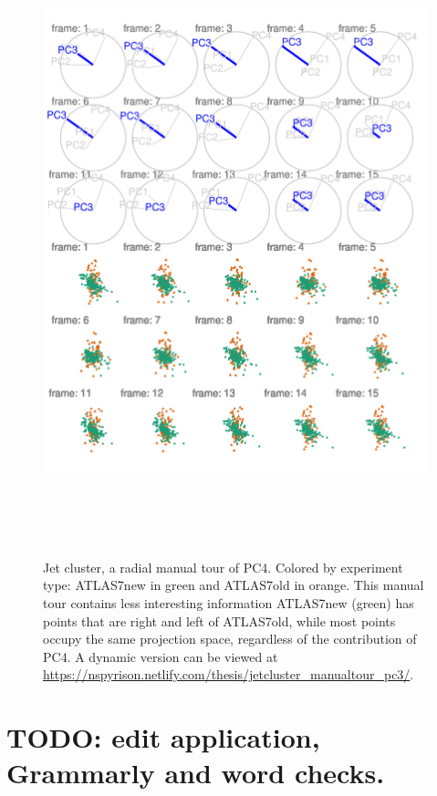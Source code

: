\documentclass{monashthesis}
\begin{document}
\begin{figure}

{\centering \includegraphics[width=6in,height=7.2in]{./figures/JetClusterBad} 

}

\caption{Jet cluster, a radial manual tour of PC4. Colored by experiment type: ATLAS7new in green and ATLAS7old in orange. This manual tour contains less interesting information ATLAS7new (green) has points that are right and left of ATLAS7old, while most points occupy the same projection space, regardless of the contribution of PC4. A dynamic version can be viewed at \url{https://nspyrison.netlify.com/thesis/jetcluster_manualtour_pc3/}.}\label{fig:JetClusterBad}
\end{figure}

\hypertarget{todo-edit-application-grammarly-and-word-checks.}{%
\section{TODO: edit application, Grammarly and word checks.}\label{todo-edit-application-grammarly-and-word-checks.}}
\end{document}
